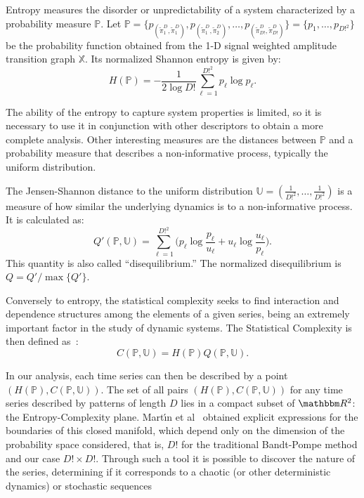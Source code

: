 \documentclass[journal]{IEEEtran}
\begin{document}
	Entropy measures the disorder or unpredictability of a system characterized by a probability measure $\mathbb{P}$.
	Let $\mathbb{P} = \{p_{(\widetilde\pi^D_1, \widetilde\pi^D_1)}, p_{(\widetilde\pi^D_1, \widetilde\pi^D_2)}, \dots, p_{(\widetilde\pi^D_{D!}, \widetilde\pi^D_{D!})} \} = \{p_1,\dots,p_{D!^2}\}$ be the probability function obtained from the 1-D signal weighted amplitude transition graph $\mathbb{X}$.
	Its normalized Shannon entropy is given by:	
	\begin{equation}
	H(\mathbb{P}) = -\frac1{2\log D!}\sum_{\ell=1}^{D!^2} p_{\ell} \log p_{\ell} .
	\label{eq:Entropia}
	\end{equation}
	
	The ability of the entropy to capture system properties is limited, so it is necessary to use it in conjunction with other des\-criptors to obtain a more complete analysis.
	Other interesting measures are the distances between $\mathbb{P}$ and a probability measure that describes a non-informative process, typically the uniform distribution.
	
	The Jensen-Shannon distance to the uniform distribution $\mathbb{U} = (\frac{1}{D!^2}, \dots, \frac{1}{D!^2})$ is a measure of how similar the underlying dynamics is to a non-informative process.
	It is calculated as:
	\begin{equation}
	Q'(\mathbb{P}, \mathbb{U}) = \sum_{\ell=1}^{D!^2} \Big(p_\ell \log\frac{p_\ell}{u_\ell} +
	u_\ell \log\frac{u_\ell}{p_\ell}
	\Big).
	\end{equation}
	This quantity is also called ``disequilibrium.''
	The normalized disequilibrium is $ Q=Q'/\max\{Q'\}$.
	
	Conversely to entropy, the statistical complexity seeks to find interaction and dependence structures among the elements of a given series, being an extremely important factor in the study of dynamic systems.
	The Statistical Complexity is then defined as~\cite{Lamberti2004Entropic}:
	\begin{equation}
	C(\mathbb{P}, \mathbb{U}) = H(\mathbb{P}) Q(\mathbb{P}, \mathbb{U}).
	\end{equation}
	
	In our analysis, each time series can then be described by a point $(H(\mathbb{P}), C(\mathbb{P}, \mathbb{U}))$.
	The set of all pairs $(H(\mathbb{P}), C(\mathbb{P}, \mathbb{U}))$ for any time series described by patterns of length $D$ lies in a compact subset of $\mathbbm R^2$: the Entropy-Complexity plane.
	Mart\'{\i}n et al~\cite{martin2006generalized} obtained explicit expressions for the boundaries of this closed manifold, which depend only on the dimension of the probability space considered, that is, $D!$ for the traditional Bandt-Pompe method and our case $D! \times D!$.
	Through such a tool it is possible to discover the nature of the series, determining if it corresponds to a chaotic (or other deterministic dynamics) or stochastic sequences
	
\end{document}
